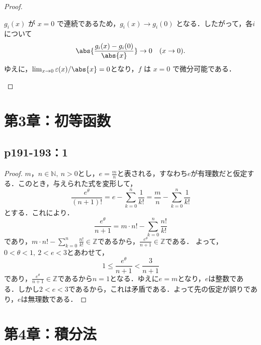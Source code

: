 \documentclass[a4paper,10pt,fleqn]{ltjsarticle}
\begin{document}
\begin{tleftbar}
\begin{proof}
\begin{description}
            $ g_i(x) $ が $ x=0 $ で連続であるため，$ g_i(x) \to g_i(0) $ となる．したがって，各$ i $について
            \[
            \abs{ \frac{g_i(x) - g_i(0)}{\abs{x}} } \to 0 \quad (x \to 0).
            \]
            ゆえに，$\lim_{x \to 0} \varepsilon(x)/\abs{x} = 0$となり，$ f $ は $ x=0 $ で微分可能である．
        \end{description}
    \end{proof}
\end{tleftbar}

\section*{第3章：初等函数}


\subsection*{p191-193：1}


\begin{tleftbar}
    \begin{proof}
        $m，n \in \mathbb{N},~n >0$とし，$e=\frac{m}{n}$と表される，すなわち$e$が有理数だと仮定する．このとき，与えられた式を変形して，
        \[
            \frac{e^\theta}{(n+1)!} = e-\sum_{k=0}^{n} \frac{1}{k!} =\frac{m}{n}-\sum_{k=0}^{n} \frac{1}{k!}
        \]
        とする．これにより．
        \[
            \frac{e^{\theta}}{n+1} = m \cdot n! - \sum_{k=0}^{n} \frac{n!}{k!}
        \]
        であり，$m \cdot n! - \sum_{k=0}^{n} \frac{n!}{k!} \in \mathbb{Z}$であるから，$\frac{e^{\theta}}{n+1} \in \mathbb{Z}$である．
        よって，$0< \theta <1,~2<e<3$とあわせて，
        \[
            1 \le \frac{e^{\theta}}{n+1} < \frac{3}{n+1}
        \]
        であり，$\frac{e^{\theta}}{n+1} \in \mathbb{Z}$であるから$n=1$となる．ゆえに$e=m$となり，$e$は整数である．しかし$2<e<3$であるから，これは矛盾である．よって先の仮定が誤りであり，$e$は無理数である．
    \end{proof}
\end{tleftbar}
\newpage 

\section*{第4章：積分法}
\end{document}
